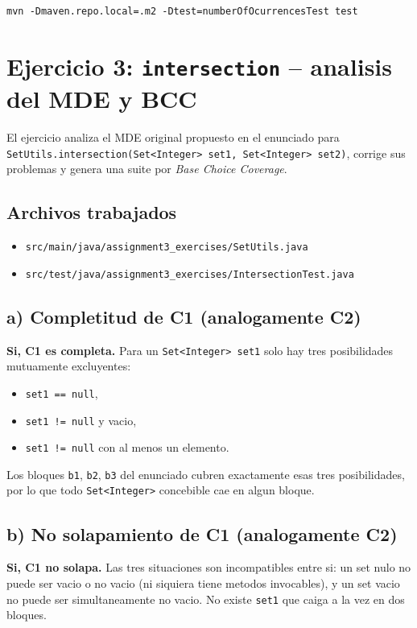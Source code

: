 \documentclass[12pt,a4paper]{article}
\begin{document}
\begin{lstlisting}[style=codestyle]
mvn -Dmaven.repo.local=.m2 -Dtest=numberOfOcurrencesTest test
\end{lstlisting}

\section{Ejercicio 3: \texttt{intersection} -- analisis del MDE y BCC}

El ejercicio analiza el MDE original propuesto en el enunciado para
\texttt{SetUtils.intersection(Set<Integer> set1, Set<Integer> set2)}, corrige sus problemas y
genera una suite por \textit{Base Choice Coverage}.

\subsection{Archivos trabajados}

\begin{itemize}
  \item \texttt{src/main/java/assignment3\_exercises/SetUtils.java}
  \item \texttt{src/test/java/assignment3\_exercises/IntersectionTest.java}
\end{itemize}

\subsection{a) Completitud de C1 (analogamente C2)}

\textbf{Si, C1 es completa.} Para un \texttt{Set<Integer> set1} solo hay tres posibilidades
mutuamente excluyentes:
\begin{itemize}
  \item \texttt{set1 == null},
  \item \texttt{set1 != null} y vacio,
  \item \texttt{set1 != null} con al menos un elemento.
\end{itemize}
Los bloques \texttt{b1}, \texttt{b2}, \texttt{b3} del enunciado cubren exactamente esas tres
posibilidades, por lo que todo \texttt{Set<Integer>} concebible cae en algun bloque.

\subsection{b) No solapamiento de C1 (analogamente C2)}

\textbf{Si, C1 no solapa.} Las tres situaciones son incompatibles entre si: un set nulo no puede
ser vacio o no vacio (ni siquiera tiene metodos invocables), y un set vacio no puede ser
simultaneamente no vacio. No existe \texttt{set1} que caiga a la vez en dos bloques.
\end{document}
